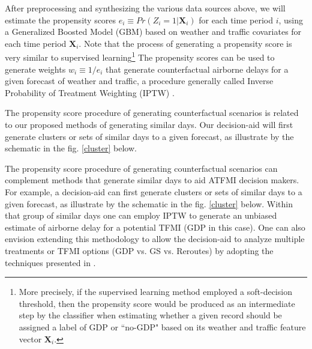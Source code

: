 \documentclass[11pt]{scrartcl}
\begin{document}
After preprocessing and synthesizing the various data sources above, we will estimate the propensity scores $e_i \equiv Pr(Z_i=1|\mathbf{X}_i)$ for each time period $i$, using a Generalized Boosted Model (GBM) \cite{ridgeway2015toolkit} based on weather and traffic covariates for each time period $\mathbf{X}_i$.  Note that the process of generating a propensity score is very similar to supervised learning\footnote{More precisely, if the supervised learning method employed a soft-decision threshold, then the propensity score would be produced as an intermediate step by the classifier when estimating whether a given record should be assigned a label of GDP or ``no-GDP" based on its weather and traffic feature vector $\mathbf{X}_i$.} The propensity scores can be used to generate weights $w_i \equiv 1/e_i$ that generate counterfactual airborne delays for a given forecast of weather and traffic, a procedure generally called Inverse Probability of Treatment Weighting (IPTW) \cite{austin2011introduction}.  

The propensity score procedure of generating counterfactual scenarios is related to our proposed methods of generating similar days.  Our decision-aid will first generate clusters or sets of similar days to a given forecast, as illustrate by the schematic in the fig. \ref{cluster} below.  


The propensity score procedure of generating counterfactual scenarios can complement methods that generate similar days to aid ATFMI decision makers.  For example, a decision-aid can first generate clusters or sets of similar days to a given forecast, as illustrate by the schematic in the fig. \ref{cluster} below.  Within that group of similar days one can employ IPTW to generate an unbiased estimate of airborne delay for a potential TFMI (GDP in this case).  One can also envision extending this methodology to allow the decision-aid to analyze multiple treatments or TFMI options (GDP vs. GS vs. Reroutes) by adopting the techniques presented in \cite{mccaffrey2013tutorial}.  
\end{document}
